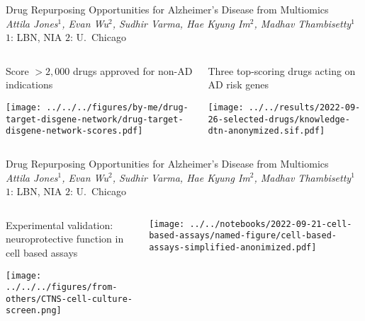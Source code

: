 \documentclass[aspectratio=169]{beamer}
\subtitle{A subtitle may be shorter and more technical}
\author{See poster \#97 for more details!}
\date{Attila Jones}
\begin{document}
\newcommand{\mytitle}{\large Drug Repurposing Opportunities for
	Alzheimer’s Disease from Multiomics\\
	\footnotesize{\emph{Attila Jones$^1$, Evan Wu$^2$, Sudhir Varma, Hae Kyung Im$^2$, Madhav Thambisetty$^1$}
\;$1$: LBN, NIA $2$: U.~Chicago}}

\begin{frame}{\mytitle }

\begin{columns}[t]
\begin{column}{0.4\textwidth}
\begin{center}
	Score $>2,000$ drugs approved for non-AD indications
\end{center}

\texttt{[image: ../../../figures/by-me/drug-target-disgene-network/drug-target-disgene-network-scores.pdf]}
\end{column}

\begin{column}{0.6\textwidth}
\begin{center}
	Three top-scoring drugs acting on AD risk genes
\end{center}

\texttt{[image: ../../results/2022-09-26-selected-drugs/knowledge-dtn-anonymized.sif.pdf]}
\end{column}
\end{columns}
\end{frame}

\begin{frame}{\mytitle }
	

\begin{columns}[t]
\begin{column}{0.5\textwidth}
\begin{center}
	Experimental validation: neuroprotective function in cell based assays
\end{center}

\texttt{[image: ../../../figures/from-others/CTNS-cell-culture-screen.png]}
\end{column}

\begin{column}{0.5\textwidth}

\texttt{[image: ../../notebooks/2022-09-21-cell-based-assays/named-figure/cell-based-assays-simplified-anonimized.pdf]}
\end{column}
\end{columns}
\end{frame}
\end{document}
